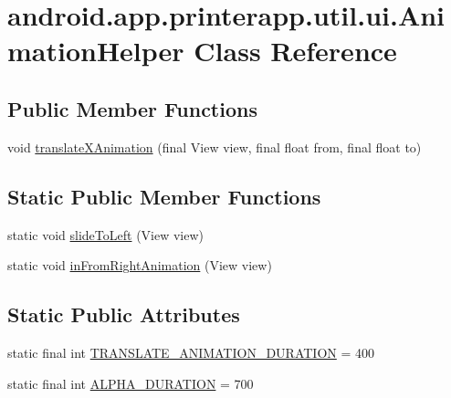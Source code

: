 \hypertarget{classandroid_1_1app_1_1printerapp_1_1util_1_1ui_1_1_animation_helper}{}\section{android.\+app.\+printerapp.\+util.\+ui.\+Animation\+Helper Class Reference}
\label{classandroid_1_1app_1_1printerapp_1_1util_1_1ui_1_1_animation_helper}
\subsection*{Public Member Functions}
\begin{DoxyCompactItemize}
\item 
void \hyperlink{classandroid_1_1app_1_1printerapp_1_1util_1_1ui_1_1_animation_helper_ab96e954e95ea2a7b9e257f79bf45eb7e}{translate\+X\+Animation} (final View view, final float from, final float to)
\end{DoxyCompactItemize}
\subsection*{Static Public Member Functions}
\begin{DoxyCompactItemize}
\item 
static void \hyperlink{classandroid_1_1app_1_1printerapp_1_1util_1_1ui_1_1_animation_helper_ae3952b101ac0ff6f5f7e97cdd398b1b1}{slide\+To\+Left} (View view)
\item 
static void \hyperlink{classandroid_1_1app_1_1printerapp_1_1util_1_1ui_1_1_animation_helper_a006596eae985cf1b1aabd45d067c874d}{in\+From\+Right\+Animation} (View view)
\end{DoxyCompactItemize}
\subsection*{Static Public Attributes}
\begin{DoxyCompactItemize}
\item 
static final int \hyperlink{classandroid_1_1app_1_1printerapp_1_1util_1_1ui_1_1_animation_helper_af44ef49c6a931dc91ca2a6f896cab30d}{T\+R\+A\+N\+S\+L\+A\+T\+E\+\_\+\+A\+N\+I\+M\+A\+T\+I\+O\+N\+\_\+\+D\+U\+R\+A\+T\+I\+ON} = 400
\item 
static final int \hyperlink{classandroid_1_1app_1_1printerapp_1_1util_1_1ui_1_1_animation_helper_a016aa876d0556640a2f5a5a872cebcee}{A\+L\+P\+H\+A\+\_\+\+D\+U\+R\+A\+T\+I\+ON} = 700
\end{DoxyCompactItemize}


